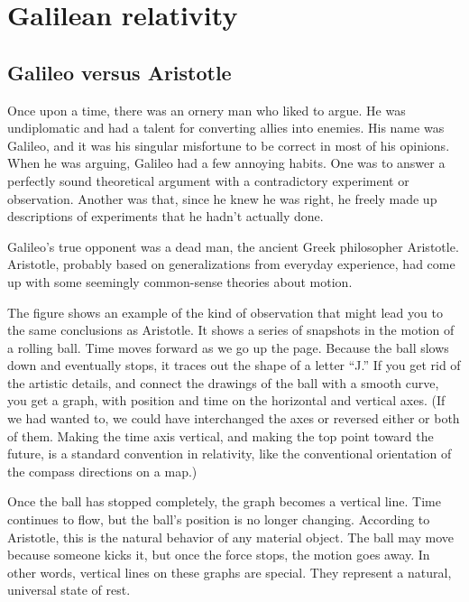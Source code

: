 \chapter{Galilean relativity}\label{ch:galilean-relativity}

\section{Galileo versus Aristotle}

Once upon a time, there was an ornery man who liked to argue.
He was undiplomatic and had a talent for converting allies into enemies.
His name was Galileo, and it was his singular misfortune to be correct in most of his opinions.
When he was arguing, Galileo had a few annoying habits. One was to answer a perfectly sound theoretical
argument with a contradictory experiment or observation. Another was that, since he
knew he was right, he freely made up descriptions of experiments that he hadn't actually done.

Galileo's true opponent was a dead man, the ancient Greek philosopher Aristotle.
Aristotle, probably based on generalizations from everyday experience, had come up
with some seemingly common-sense theories about motion.

\pagebreak

The figure  shows an example of the kind of observation that might lead you to
the same conclusions as Aristotle. It shows a series of snapshots in the motion
of a rolling ball. Time moves forward as we go up the page.
Because the ball slows down and eventually stops, it traces out the shape of a
letter ``J.'' If you get rid of the artistic details, and connect the drawings of
the ball with a smooth curve, you get a graph, with position and time on the
horizontal and vertical axes. (If we had wanted to, we could have interchanged
the axes or reversed either or both of them. Making the time axis vertical, and
making the top point toward the future, is a standard convention in relativity,
like the conventional orientation of the compass directions on a map.)

Once the ball has stopped completely, the graph becomes a vertical line. Time
continues to flow, but the ball's position is no longer changing. According to
Aristotle, this is the natural behavior of any material object. The ball may move
because someone kicks it, but once the force stops, the motion goes away.
In other words, vertical lines on these graphs are special. They represent a natural, universal
state of rest.

